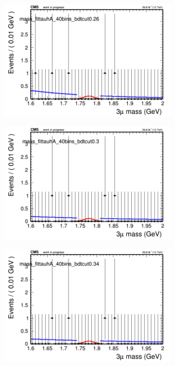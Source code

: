\begin{figure}[H]
\begin{subfigure}{0.2\textwidth}
        \includegraphics[width=\textwidth]{power_law/plots/tauhA/massfit_tauhA_40bins_bdtcut0.26.png}
        \caption{}
    \end{subfigure}
    \begin{subfigure}{0.2\textwidth}
        \includegraphics[width=\textwidth]{power_law/plots/tauhA/massfit_tauhA_40bins_bdtcut0.3.png}
        \caption{}
    \end{subfigure}
    \begin{subfigure}{0.2\textwidth}
        \includegraphics[width=\textwidth]{power_law/plots/tauhA/massfit_tauhA_40bins_bdtcut0.34.png}

\end{subfigure}
\end{figure}
